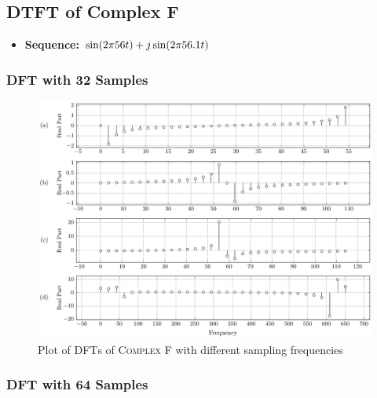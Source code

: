 \documentclass[../../course]{subfiles}
\begin{document}
\pagebreak

\subsection{DTFT of Complex F} \label{ssec:dtftCplxF}

\begin{itemize} [label=]

    \item \textbf{Sequence:} $\sin(2 \pi 56 t) + j \sin(2 \pi 56.1 t)$

\end{itemize}

\subsubsection{DFT with 32 Samples}

\vfill

\begin{figure} [H]
    \centering
     {
        \includegraphics[height = 0.8\textheight] {tikzpics/plotDftComplexF32.pdf}
    }
     {Plot of \textsc{DFT}s of \textsc{Complex F} with different sampling frequencies}
    \label{plt:dftComplexF}
\end{figure}

\subsubsection{DFT with 64 Samples}

\vfill
\end{document}
